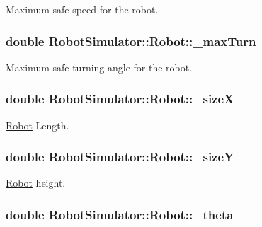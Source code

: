 Maximum safe speed for the robot. \hypertarget{structRobotSimulator_1_1Robot_af9967fd4b2e74e67e5b9d3bc45fd30d3}{
\subsubsection[{\-\_\-max\-Turn}]{\setlength{\rightskip}{0pt plus 5cm}double Robot\-Simulator\-::\-Robot\-::\-\_\-max\-Turn}}\label{structRobotSimulator_1_1Robot_af9967fd4b2e74e67e5b9d3bc45fd30d3}
Maximum safe turning angle for the robot. \hypertarget{structRobotSimulator_1_1Robot_afc7eddc29b81662393361dc8ca24806a}{
\subsubsection[{\-\_\-size\-X}]{\setlength{\rightskip}{0pt plus 5cm}double Robot\-Simulator\-::\-Robot\-::\-\_\-size\-X}}\label{structRobotSimulator_1_1Robot_afc7eddc29b81662393361dc8ca24806a}
\hyperlink{structRobotSimulator_1_1Robot}{Robot} Length. \hypertarget{structRobotSimulator_1_1Robot_a15d2779576df86d973c42c12c1f3c2ba}{
\subsubsection[{\-\_\-size\-Y}]{\setlength{\rightskip}{0pt plus 5cm}double Robot\-Simulator\-::\-Robot\-::\-\_\-size\-Y}}\label{structRobotSimulator_1_1Robot_a15d2779576df86d973c42c12c1f3c2ba}
\hyperlink{structRobotSimulator_1_1Robot}{Robot} height. \hypertarget{structRobotSimulator_1_1Robot_a9c91ff0ff4514da0c9cd56f45064032e}{
\subsubsection[{\-\_\-theta}]{\setlength{\rightskip}{0pt plus 5cm}double Robot\-Simulator\-::\-Robot\-::\-\_\-theta}}\label{structRobotSimulator_1_1Robot_a9c91ff0ff4514da0c9cd56f45064032e}
